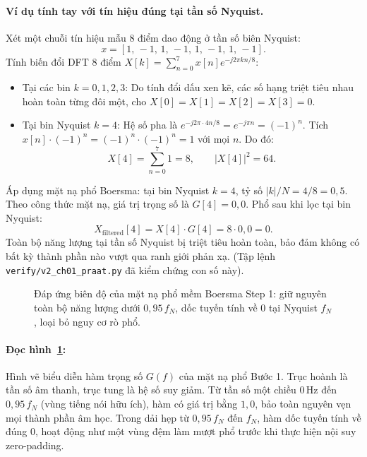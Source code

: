 \paragraph{Ví dụ tính tay với tín hiệu đúng tại tần số Nyquist.}
Xét một chuỗi tín hiệu mẫu 8 điểm dao động ở tần số biên Nyquist:
\[
x = [1,\,-1,\,1,\,-1,\,1,\,-1,\,1,\,-1].
\]
Tính biến đổi DFT 8 điểm $X[k] = \sum_{n=0}^{7} x[n] e^{-j 2\pi k n / 8}$:
\begin{itemize}[leftmargin=1.4em]
    \item Tại các bin $k = 0, 1, 2, 3$: Do tính đổi dấu xen kẽ, các số hạng triệt tiêu nhau hoàn toàn từng đôi một, cho $X[0] = X[1] = X[2] = X[3] = 0$.
    \item Tại bin Nyquist $k = 4$: Hệ số pha là $e^{-j 2\pi \cdot 4 n / 8} = e^{-j \pi n} = (-1)^n$. Tích $x[n] \cdot (-1)^n = (-1)^n \cdot (-1)^n = 1$ với mọi $n$. Do đó:
    \[
    X[4] = \sum_{n=0}^{7} 1 = 8, \qquad |X[4]|^2 = 64.
    \]
\end{itemize}
Áp dụng mặt nạ phổ Boersma: tại bin Nyquist $k = 4$, tỷ số $|k|/N = 4/8 = 0{,}5$. Theo công thức mặt nạ, giá trị trọng số là $G[4] = 0{,}0$.
Phổ sau khi lọc tại bin Nyquist:
\[
X_{\mathrm{filtered}}[4] = X[4] \cdot G[4] = 8 \cdot 0{,}0 = 0.
\]
Toàn bộ năng lượng tại tần số Nyquist bị triệt tiêu hoàn toàn, bảo đảm không có bất kỳ thành phần nào vượt qua ranh giới phản xạ. (Tập lệnh \texttt{verify/v2\_ch01\_praat.py} đã kiểm chứng con số này).

\begin{figure}[H]
\centering
{}
\caption{Đáp ứng biên độ của mặt nạ phổ mềm Boersma Step 1: giữ nguyên toàn bộ năng lượng dưới $0{,}95\,f_N$, dốc tuyến tính về 0 tại Nyquist $f_N$, loại bỏ nguy cơ rò phổ.}
\label{fig:ch01_soft_mask}
\end{figure}

\paragraph{Đọc hình~\ref{fig:ch01_soft_mask}:}
Hình vẽ biểu diễn hàm trọng số $G(f)$ của mặt nạ phổ Bước 1. Trục hoành là tần số âm thanh, trục tung là hệ số suy giảm. Từ tần số một chiều $0\,\text{Hz}$ đến $0{,}95\,f_N$ (vùng tiếng nói hữu ích), hàm có giá trị bằng $1{,}0$, bảo toàn nguyên vẹn mọi thành phần âm học. Trong dải hẹp từ $0{,}95\,f_N$ đến $f_N$, hàm dốc tuyến tính về đúng $0$, hoạt động như một vùng đệm làm mượt phổ trước khi thực hiện nội suy zero-padding.

